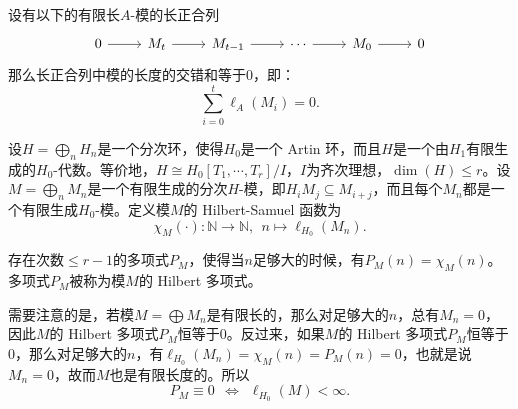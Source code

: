 \begin{lemma} 
设有以下的有限长$A$-模的长正合列
\begin{displaymath}
\begin{tikzcd}
0 \arrow[r] & M_t \arrow[r] & M_{t-1} \arrow[r] & \cdots \arrow[r] & M_0 \arrow[r] & 0
\end{tikzcd}
\end{displaymath}
那么长正合列中模的长度的交错和等于$0$，即：
\begin{equation}
\sum\limits_{i=0}^t \ell_A(M_i) = 0.
\end{equation}
\end{lemma}

设$H = \bigoplus\limits_n H_n$是一个分次环，使得$H_0$是一个 Artin 环，而且$H$是一个由$H_1$有限生成的$H_0$-代数。等价地，$H \cong H_0[T_1,\cdots,T_r] / I$，$I$为齐次理想，$\dim(H) \leqslant r$。设$M = \bigoplus\limits_n M_n$是一个有限生成的分次$H$-模，即$H_iM_j \subseteq M_{i+j}$，而且每个$M_n$都是一个有限生成$H_0$-模。定义模$M$的 Hilbert-Samuel 函数为
\begin{equation}
\chi_M(\cdot): \mathbb{N} \longrightarrow \mathbb{N}, ~~ n \mapsto \ell_{H_0}(M_n).
\end{equation}

\begin{theorem}
\label{hilbert polyn for modules}
存在次数$\leqslant r-1$的多项式$P_M$，使得当$n$足够大的时候，有$P_M(n) = \chi_M(n)$。多项式$P_M$被称为模$M$的 Hilbert 多项式。
\end{theorem}

需要注意的是，若模$M = \bigoplus M_n$是有限长的，那么对足够大的$n$，总有$M_n = 0$，因此$M$的 Hilbert 多项式$P_M$恒等于$0$。反过来，如果$M$的 Hilbert 多项式$P_M$恒等于$0$，那么对足够大的$n$，有$\ell_{H_0}(M_n) = \chi_M(n) = P_M(n) = 0$，也就是说$M_n = 0$，故而$M$也是有限长度的。所以
\[P_M\equiv 0 ~~ \Longleftrightarrow ~~ \ell_{H_0}(M) < \infty.\]

